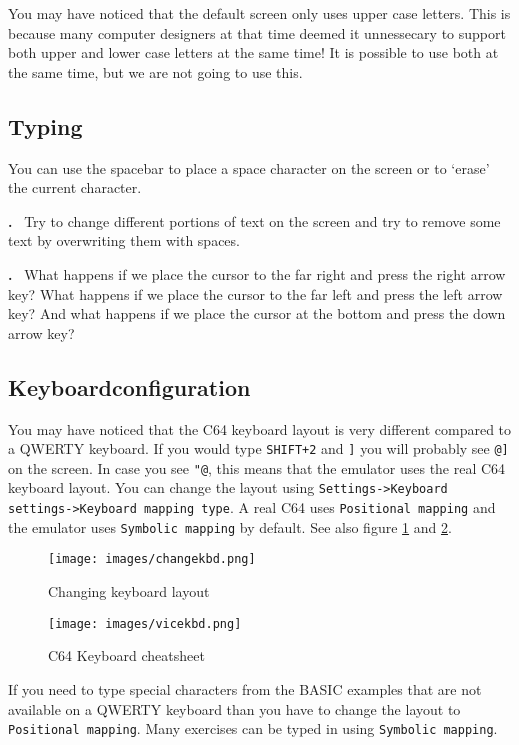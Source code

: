 \documentclass{article}
\newcounter{problem}
\newcounter{solution}
\newcommand\problem{%
  \stepcounter{problem}%
  \textbf{\theproblem.}~%
  \setcounter{solution}{0}%
}
\begin{document}
You may have noticed that the default screen only uses upper case letters.
This is because many computer designers at that time deemed it unnessecary to support both upper and lower case letters at the same time!
It is possible to use both at the same time, but we are not going to use this.

\subsection{Typing}

You can use the spacebar to place a space character on the screen or to `erase' the current character.

\problem Try to change different portions of text on the screen and try to remove some text by overwriting them with spaces.

\problem What happens if we place the cursor to the far right and press the right arrow key?
What happens if we place the cursor to the far left and press the left arrow key?
And what happens if we place the cursor at the bottom and press the down arrow key?

\subsection{Keyboardconfiguration}

You may have noticed that the C64 keyboard layout is very different compared to a QWERTY keyboard.
If you would type \verb:SHIFT+2: and \verb:]: you will probably see \verb:@]: on the screen.
In case you see \verb:"@:, this means that the emulator uses the real C64 keyboard layout.
You can change the layout using \verb:Settings->Keyboard settings->Keyboard mapping type:.
A real C64 uses \verb:Positional mapping: and the emulator uses \verb:Symbolic mapping: by default.
See also figure \ref{fig:changekbd} and \ref{fig:vicekbd}.

\begin{figure}
\centering
\texttt{[image: images/changekbd.png]}
\caption{Changing keyboard layout}
\label{fig:changekbd}
\end{figure}

\begin{figure}
\centering
\texttt{[image: images/vicekbd.png]}
\caption{C64 Keyboard cheatsheet}
\label{fig:vicekbd}
\end{figure}

If you need to type special characters from the BASIC examples that are not available on a QWERTY keyboard than you have to change the layout to \verb:Positional mapping:.
Many exercises can be typed in using \verb:Symbolic mapping:.
\end{document}
